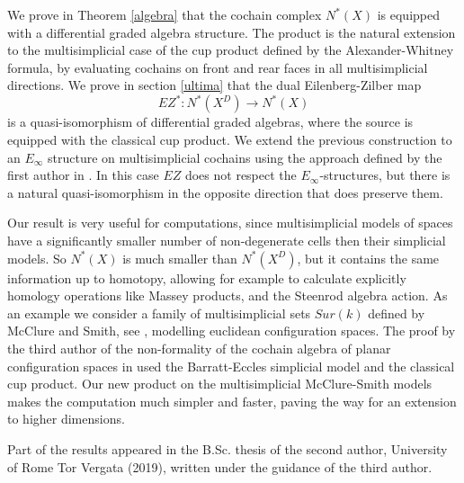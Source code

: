 
\medskip

We prove in Theorem \ref{algebra} %
that the cochain complex $N^*(X)$ is equipped with a differential graded algebra structure.
The product is the natural extension to the multisimplicial case of the cup product defined by the Alexander-Whitney formula, by
evaluating cochains on front and rear faces in all multisimplicial directions.
We prove in section \ref{ultima} that the dual Eilenberg-Zilber map
$$EZ^*:N^*(X^D) \to N^*(X)$$ %
 is a quasi-isomorphism of differential graded algebras, where the source is equipped with the classical cup product.
We extend the previous construction to an $E_\infty$ structure on multisimplicial cochains using the approach defined by the first author in \cite{anibal}.
In this case $EZ$ does not respect the $E_\infty$-structures, but there is a natural quasi-isomorphism in the opposite direction that does preserve them.

Our result is very useful for computations, since multisimplicial models of spaces have a significantly smaller number of non-degenerate cells then their simplicial models.
So $N^*(X)$ is much smaller than $N^*(X^D)$, but it contains the same information up to homotopy, allowing for example to calculate explicitly homology operations like Massey products, and the Steenrod algebra action.
As an example we consider a family of multisimplicial sets $Sur(k)$ defined by McClure and Smith, see \cite{MS}, modelling euclidean configuration spaces.
The proof by the third author of the non-formality of the cochain algebra of planar configuration spaces in \cite{formality} used the Barratt-Eccles simplicial model and the classical cup product.
Our new product on the multisimplicial McClure-Smith models makes the computation much simpler and faster, paving the way for an extension to higher dimensions.

\medskip

Part of the results appeared in the B.Sc. thesis of the second author, University of Rome Tor Vergata (2019), written under the guidance of the third author.